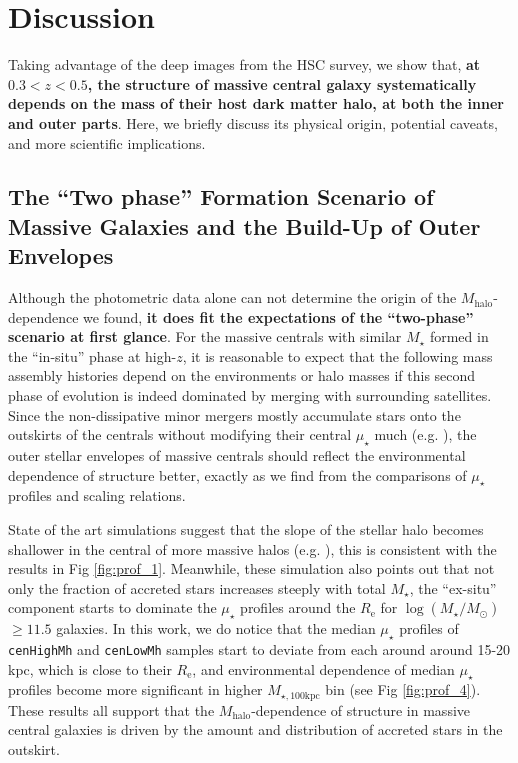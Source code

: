 \documentclass[a4paper,fleqn,usenatbib]{mnras}
\def\rbcg{\texttt{cenHighMh}}
\def\nbcg{\texttt{cenLowMh}}
\def\mstar{{$M_{\star}$}}
\def\mhalo{{$M_{\mathrm{halo}}$}}
\def\logms{{$\log (M_{\star}/M_{\odot})$}}
\def\mtot{{$M_{\star,100\mathrm{kpc}}$}}
\def\mden{{$\mu_{\star}$}}
\begin{document}
\section{Discussion}
    \label{sec:discussion}
    
    Taking advantage of the deep images from the HSC survey, we show that,
    \textbf{at $0.3 < z < 0.5$, the structure of massive central galaxy systematically 
    depends on the mass of their host dark matter halo, at both the inner and outer
    parts}. 
    Here, we briefly discuss its physical origin, potential caveats, and more scientific 
    implications. 
    
    
\subsection{The ``Two phase'' Formation Scenario of Massive Galaxies and the 
            Build-Up of Outer Envelopes}
    
    Although the photometric data alone can not determine the origin of the 
    \mhalo{}-dependence we found, \textbf{it does fit the expectations of the 
    ``two-phase'' scenario at first glance}. 
    For the massive centrals with similar \mstar{} formed in the ``in-situ'' phase at 
    high-$z$, it is reasonable to expect that the following mass assembly histories 
    depend on the environments or halo masses if this second phase of evolution is 
    indeed dominated by merging with surrounding satellites. 
    Since the non-dissipative minor mergers mostly accumulate stars onto the 
    outskirts of the centrals without modifying their central \mden{} much
    (e.g. \citealt{Oogi2013, Bedorf2013}), the outer stellar envelopes of massive
    centrals should reflect the environmental dependence of structure better, exactly 
    as we find from the comparisons of \mden{} profiles and scaling relations. 
       
    State of the art simulations suggest that the slope of the stellar halo becomes 
    shallower in the central of more massive halos (e.g. \citealt{Pillepich2014}), 
    this is consistent with the results in Fig \ref{fig:prof_1}. 
    Meanwhile, these simulation also points out that not only the fraction of 
    accreted stars increases steeply with total \mstar{}, the ``ex-situ'' component
    starts to dominate the \mden{} profiles around the $R_{\mathrm{e}}$ for 
    \logms{}$\geq 11.5$ galaxies.
    In this work, we do notice that the median \mden{} profiles of \rbcg{} and \nbcg{} 
    samples start to deviate from each around around 15-20 kpc, which is close to 
    their $R_{\mathrm{e}}$, and environmental dependence of median \mden{} profiles 
    become more significant in higher \mtot{} bin (see Fig \ref{fig:prof_4}). 
    These results all support that the \mhalo{}-dependence of structure in massive 
    central galaxies is driven by the amount and distribution of accreted stars 
    in the outskirt. 
        
\end{document}
